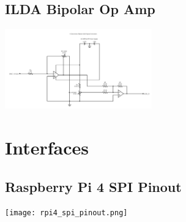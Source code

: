 \documentclass[journal]{IEEEtran}
\begin{document}
    \subsection{ILDA Bipolar Op Amp}

    \includegraphics[width=2.5in]{../artifacts/docs/circuit_diagrams/ilda_op_amp_circuit.png}

    \section{Interfaces}
    \subsection{Raspberry Pi 4 SPI Pinout}

    \texttt{[image: rpi4\_spi\_pinout.png]}
\end{document}
